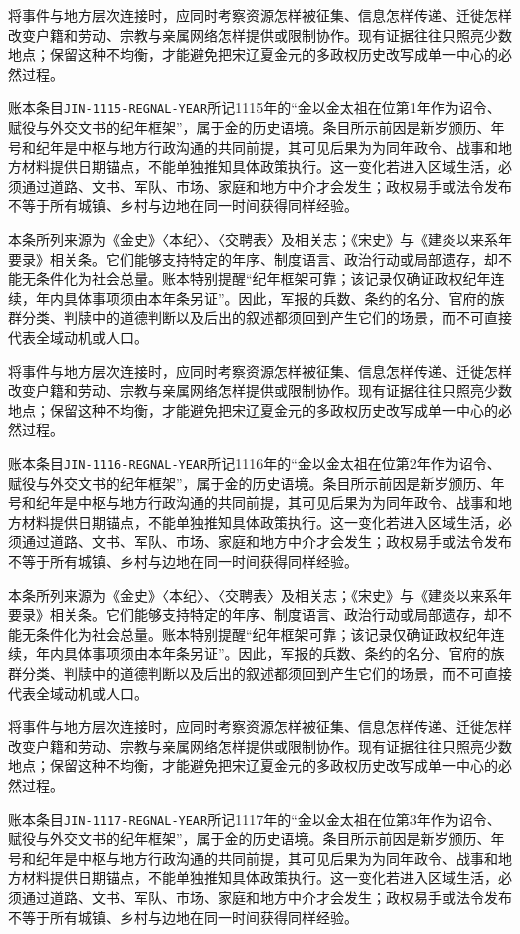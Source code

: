 将事件与地方层次连接时，应同时考察资源怎样被征集、信息怎样传递、迁徙怎样改变户籍和劳动、宗教与亲属网络怎样提供或限制协作。现有证据往往只照亮少数地点；保留这种不均衡，才能避免把宋辽夏金元的多政权历史改写成单一中心的必然过程。

账本条目\texttt{JIN-1115-REGNAL-YEAR}所记1115年的“金以金太祖在位第1年作为诏令、赋役与外交文书的纪年框架”，属于金的历史语境。条目所示前因是新岁颁历、年号和纪年是中枢与地方行政沟通的共同前提，其可见后果为为同年政令、战事和地方材料提供日期锚点，不能单独推知具体政策执行。这一变化若进入区域生活，必须通过道路、文书、军队、市场、家庭和地方中介才会发生；政权易手或法令发布不等于所有城镇、乡村与边地在同一时间获得同样经验。

本条所列来源为《金史》〈本纪〉、〈交聘表〉及相关志；《宋史》与《建炎以来系年要录》相关条。它们能够支持特定的年序、制度语言、政治行动或局部遗存，却不能无条件化为社会总量。账本特别提醒“纪年框架可靠；该记录仅确证政权纪年连续，年内具体事项须由本年条另证”。因此，军报的兵数、条约的名分、官府的族群分类、判牍中的道德判断以及后出的叙述都须回到产生它们的场景，而不可直接代表全域动机或人口。

将事件与地方层次连接时，应同时考察资源怎样被征集、信息怎样传递、迁徙怎样改变户籍和劳动、宗教与亲属网络怎样提供或限制协作。现有证据往往只照亮少数地点；保留这种不均衡，才能避免把宋辽夏金元的多政权历史改写成单一中心的必然过程。

账本条目\texttt{JIN-1116-REGNAL-YEAR}所记1116年的“金以金太祖在位第2年作为诏令、赋役与外交文书的纪年框架”，属于金的历史语境。条目所示前因是新岁颁历、年号和纪年是中枢与地方行政沟通的共同前提，其可见后果为为同年政令、战事和地方材料提供日期锚点，不能单独推知具体政策执行。这一变化若进入区域生活，必须通过道路、文书、军队、市场、家庭和地方中介才会发生；政权易手或法令发布不等于所有城镇、乡村与边地在同一时间获得同样经验。

本条所列来源为《金史》〈本纪〉、〈交聘表〉及相关志；《宋史》与《建炎以来系年要录》相关条。它们能够支持特定的年序、制度语言、政治行动或局部遗存，却不能无条件化为社会总量。账本特别提醒“纪年框架可靠；该记录仅确证政权纪年连续，年内具体事项须由本年条另证”。因此，军报的兵数、条约的名分、官府的族群分类、判牍中的道德判断以及后出的叙述都须回到产生它们的场景，而不可直接代表全域动机或人口。

将事件与地方层次连接时，应同时考察资源怎样被征集、信息怎样传递、迁徙怎样改变户籍和劳动、宗教与亲属网络怎样提供或限制协作。现有证据往往只照亮少数地点；保留这种不均衡，才能避免把宋辽夏金元的多政权历史改写成单一中心的必然过程。

账本条目\texttt{JIN-1117-REGNAL-YEAR}所记1117年的“金以金太祖在位第3年作为诏令、赋役与外交文书的纪年框架”，属于金的历史语境。条目所示前因是新岁颁历、年号和纪年是中枢与地方行政沟通的共同前提，其可见后果为为同年政令、战事和地方材料提供日期锚点，不能单独推知具体政策执行。这一变化若进入区域生活，必须通过道路、文书、军队、市场、家庭和地方中介才会发生；政权易手或法令发布不等于所有城镇、乡村与边地在同一时间获得同样经验。

